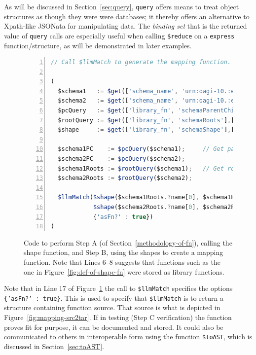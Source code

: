 \documentclass[10pt,letterpaper]{article} %
\newcommand{\stt}[1]{\texttt{#1}} %
\begin{document}
As will be discussed in Section~\ref{sec:query}, \stt{query} offers means to treat object structures as though they were were databases;
it thereby offers an alternative to Xpath-like JSONata for manipulating data.
The \textit{binding set} that is the returned value of \stt{query} calls are especially useful when calling \stt{\$reduce} on a \stt{express} function/structure, as will be demonstrated in later examples.

\begin{figure}[H]
  \caption{Code to perform Step A (of Section~\ref{methodology-of-fn}), calling the shape function, and Step B, using the shapes to create a mapping function.
  Note that Lines 6--8 suggests that functions such as the one in Figure~\ref{fig:def-of-shape-fn} were stored as library functions.}
  \label{fig:call-to-shape}
\begin{lstlisting}[language=JavaScript,numberstyle=\scriptsize,basicstyle=\ttfamily\scriptsize,numbers=left,stepnumber=1,breaklines=true]
// Call $llmMatch to generate the mapping function. Note use of {'asFn?' true} in the call.

(
  $schema1   := $get(['schema_name', 'urn:oagi-10.:elena.2023-07-02.ProcessInvoice-BC_1_v2'], ['schema_content']);
  $schema2   := $get(['schema_name', 'urn:oagi-10.:elena.2023-07-02.ProcessInvoice-BC_2_v2'], ['schema_content']);
  $pcQuery   := $get(['library_fn', 'schemaParentChild'],['fn_exe']).fn_exe;
  $rootQuery := $get(['library_fn', 'schemaRoots'],['fn_exe']).fn_exe;
  $shape     := $get(['library_fn', 'schemaShape'],['fn_exe']).fn_exe;

  $schema1PC    := $pcQuery($schema1);     // Get parent-child relationships of each schema.
  $schema2PC    := $pcQuery($schema2);
  $schema1Roots := $rootQuery($schema1);   // Get root elements of each schema.
  $schema2Roots := $rootQuery($schema2);

  $llmMatch($shape($schema1Roots.?name[0], $schema1PC), // [0] is cheating a bit; there could be multiple roots.
            $shape($schema2Roots.?name[0], $schema2PC), // Call $llmMatch to do shape matching
            {'asFn?' : true})
)
\end{lstlisting}
\end{figure} \vspace{-3em}

Note that in Line 17 of Figure~\ref{fig:call-to-shape} the call to \stt{\$llmMatch} specifies the options \stt{\{'asFn?' : true\}}. This is used to specify that \stt{\$llmMatch} is to return a structure containing function source.
That source is what is depicted in Figure~\ref{fig:mapping-src2tar}.
If in testing (Step C verification) the function proves fit for purpose, it can be documented and stored.
It could also be communicated to others in interoperable form using the function \stt{\$toAST}, which is discussed in Section~\ref{sec:toAST}.
\end{document}
